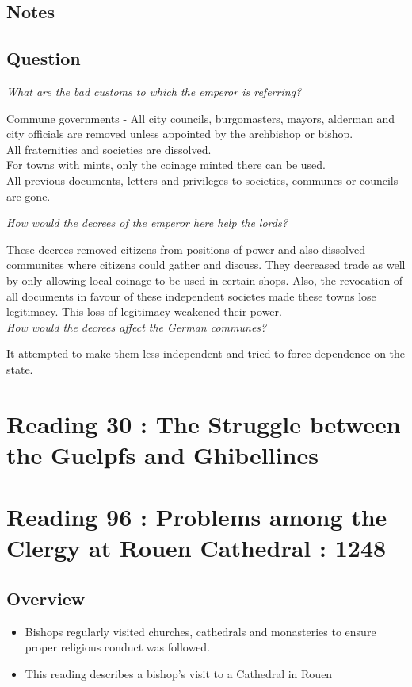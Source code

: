 \documentclass[12pt]{article}
\begin{document}
{\subsection*{Notes}

\subsection*{Question}

\textit{What are the bad customs to which the emperor is referring?}

Commune governments - All city councils, burgomasters, mayors, alderman and city officials are removed unless appointed by the archbishop or bishop. \\

All fraternities and societies are dissolved.\\

For towns with mints, only the coinage minted there can be used.\\

All previous documents, letters and privileges to societies, communes or councils are gone.


\textit{How would the decrees of the emperor here help the lords?}

These decrees removed citizens from positions of power and also dissolved communites where citizens could gather and discuss. They decreased trade as well by only allowing local coinage to be used in certain shops. Also, the revocation of all documents in favour of these independent societes made these towns lose legitimacy. This loss of legitimacy weakened their power.\\

\textit{How would the decrees affect the German communes?}

It attempted to make them less independent and tried to force dependence on the state.\\

\section*{Reading 30 : The Struggle between the Guelpfs and Ghibellines}


\section*{Reading 96 : Problems among the Clergy at Rouen Cathedral : 1248}

\subsection*{Overview}
\begin{itemize}
	\item Bishops regularly visited churches, cathedrals and monasteries to ensure proper religious conduct was followed.
	\item This reading describes a bishop's visit to a Cathedral in Rouen
\end{itemize}


}
\end{document}
